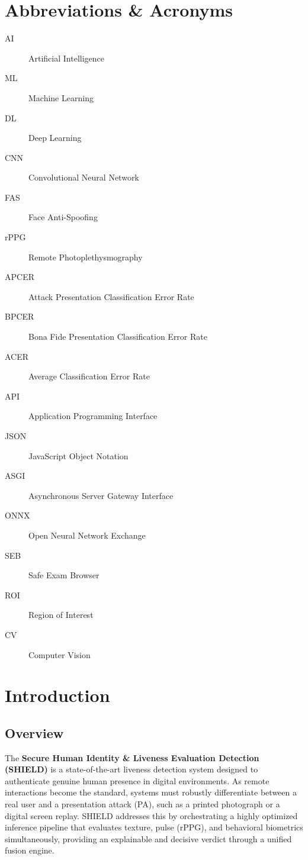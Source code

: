 \documentclass[12pt, a4paper]{report}
\begin{document}
\clearpage
\tableofcontents

\chapter*{Abbreviations \& Acronyms}
\begin{description}
    \item[AI] Artificial Intelligence
    \item[ML] Machine Learning
    \item[DL] Deep Learning
    \item[CNN] Convolutional Neural Network
    \item[FAS] Face Anti-Spoofing
    \item[rPPG] Remote Photoplethysmography
    \item[APCER] Attack Presentation Classification Error Rate
    \item[BPCER] Bona Fide Presentation Classification Error Rate
    \item[ACER] Average Classification Error Rate
    \item[API] Application Programming Interface
    \item[JSON] JavaScript Object Notation
    \item[ASGI] Asynchronous Server Gateway Interface
    \item[ONNX] Open Neural Network Exchange
    \item[SEB] Safe Exam Browser
    \item[ROI] Region of Interest
    \item[CV] Computer Vision
\end{description}

\clearpage
{}

\chapter{Introduction}

\section{Overview}
The \textbf{Secure Human Identity \& Liveness Evaluation Detection (SHIELD)} is a state-of-the-art liveness detection system designed to authenticate genuine human presence in digital environments. As remote interactions become the standard, systems must robustly differentiate between a real user and a presentation attack (PA), such as a printed photograph or a digital screen replay. SHIELD addresses this by orchestrating a highly optimized inference pipeline that evaluates texture, pulse (rPPG), and behavioral biometrics simultaneously, providing an explainable and decisive verdict through a unified fusion engine. 
\end{document}
